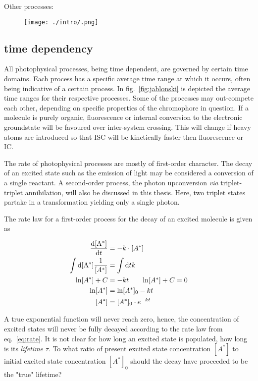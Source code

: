 		Other processes:

		\begin{figure}[!h]
			\centering
			\label{fig:}
			\texttt{[image: ./intro/.png]}
			\caption{}
		\end{figure}
 		
 	
		\subsection{time dependency}
		All photophysical processes, being time dependent, are governed by certain time domains. Each process has a specific average time range at which it occurs, often being indicative of a certain process. In fig.~\ref{fig:jablonski} is depicted the average time ranges for their respective processes. Some of the processes may out-compete each other, depending on specific properties of the chromophore in question. If a molecule is purely organic, fluorescence or internal conversion to the electronic groundstate will be favoured over inter-system crossing. This will change if heavy atoms are introduced so that ISC will be kinetically faster then fluorescence or IC. 

		The rate of photophysical processes are mostly of first-order character. The decay of an excited state such as the emission of light  may be considered a conversion of a single reactant. A second-order process, the photon upconversion \textit{via} triplet-triplet annihilation, will also be discussed in this thesis. Here, two triplet states partake in a transformation yielding only a single photon. 

		The rate law for a first-order process for the decay of an excited molecule  is given as 

		\begin{equation}
		\label{eq:rate}
		\begin{split}
			\frac{\mathrm{d}[\mathrm{A^{\ast}}]}{\mathrm{d}t} &= - k\cdot[A^{\ast}] \\
			\int\mathrm{d}[\mathrm{A^{\ast}}]\frac{1}{[A^{\ast}]} &= \int\mathrm{d}t k \\
			\ln[A^{\ast}] + C &= -kt \tag*{$\ln[A^{\ast}] + C = 0$} \\
			\ln[A^{\ast}] &= \ln[A^{\ast}]_0 -kt \\
			[A^{\ast}] &= [A^{\ast}]_0 \cdot e^{-kt}
		\end{split}
		\end{equation}

		A true exponential function will never reach zero, hence, the concentration of excited states will never be fully decayed according to the rate law from eq.~\ref{eq:rate}. It is not clear for how long an excited state is populated, how long is its \emph{lifetime} $\tau$. To what ratio of present excited state concentration $[A^{\ast}]$ to initial excited state concentration $[A^{\ast}]_0$ should the decay have proceeded to be the "true" lifetime?


